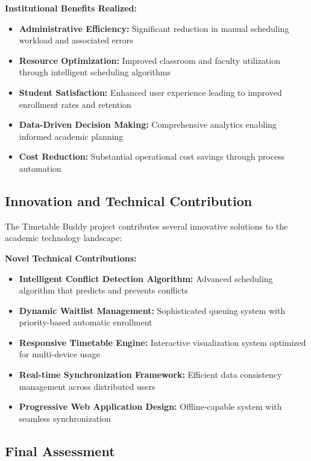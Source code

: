 \textbf{Institutional Benefits Realized:}
\begin{itemize}[leftmargin=*]
    \item \textbf{Administrative Efficiency:} Significant reduction in manual scheduling workload and associated errors
    \item \textbf{Resource Optimization:} Improved classroom and faculty utilization through intelligent scheduling algorithms
    \item \textbf{Student Satisfaction:} Enhanced user experience leading to improved enrollment rates and retention
    \item \textbf{Data-Driven Decision Making:} Comprehensive analytics enabling informed academic planning
    \item \textbf{Cost Reduction:} Substantial operational cost savings through process automation
\end{itemize}

\subsection{Innovation and Technical Contribution}

The Timetable Buddy project contributes several innovative solutions to the academic technology landscape:

\textbf{Novel Technical Contributions:}
\begin{itemize}[leftmargin=*]
    \item \textbf{Intelligent Conflict Detection Algorithm:} Advanced scheduling algorithm that predicts and prevents conflicts
    \item \textbf{Dynamic Waitlist Management:} Sophisticated queuing system with priority-based automatic enrollment
    \item \textbf{Responsive Timetable Engine:} Interactive visualization system optimized for multi-device usage
    \item \textbf{Real-time Synchronization Framework:} Efficient data consistency management across distributed users
    \item \textbf{Progressive Web Application Design:} Offline-capable system with seamless synchronization
\end{itemize}

\subsection{Final Assessment}

